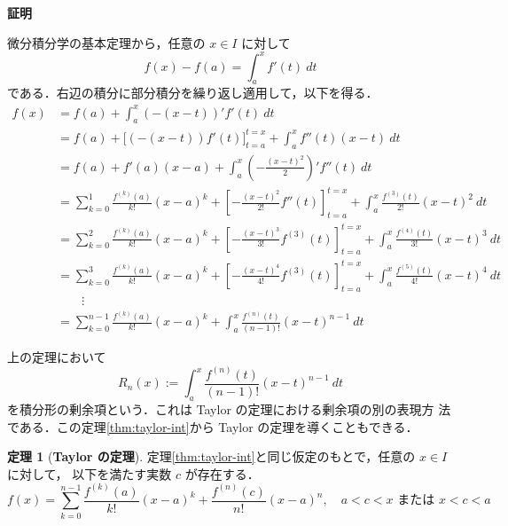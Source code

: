 \documentclass[10pt, uplatex, dvipdfmx]{jsarticle}
\makeatletter
\renewenvironment{proof}[1][\proofname]{\par
  \pushQED{\qed}%
  \normalfont \topsep6\p@\@plus6\p@\relax
  \trivlist
  \item\relax
  {\bfseries
  #1\@addpunct{.}}\hspace\labelsep\ignorespaces
}{%
  \popQED\endtrivlist\@endpefalse
}
\theoremstyle{definition}
\newtheorem{theorem}{定理}[section]
\renewcommand{\proofname}{\textbf{証明}}
\numberwithin{equation}{section}
\makeatother
\begin{document}
\begin{proof}
  微分積分学の基本定理から，任意の $x \in I$ に対して
  \[
    f(x)-f(a) = \int_{a}^{x} f'(t) \ dt
  \]
  である．右辺の積分に部分積分を繰り返し適用して，以下を得る． 
  \[
    \begin{aligned}
      f(x) &= f(a) + \int_{a}^{x} \left( -(x-t)\right)' f'(t) \ dt\\
      &= f(a) + \Big[\left( -\left(x-t\right)\right)f'(t)\Big]_{t=a}^{t=x} + \int_{a}^{x} f''(t)(x-t)\ dt\\
      &= f(a) + f'(a)(x-a)+ \int_{a}^{x} \left( -\frac{(x-t)^2}{2}\right)' f''(t) \ dt\\
      &= \sum_{k=0}^{1}\frac{f^{(k)}(a)}{k!}(x-a)^k + \left[ -\frac{(x-t)^2}{2!}f''(t)\right]_{t=a}^{t=x}
      + \int_{a}^{x}\frac{f^{(3)}(t)}{2!}(x-t)^2\ dt\\
      &= \sum_{k=0}^{2}\frac{f^{(k)}(a)}{k!}(x-a)^k + \left[-\frac{(x-t)^3}{3!}f^{(3)}(t)\right]_{t=a}^{t=x}
      +\int_{a}^{x} \frac{f^{(4)}(t)}{3!}(x-t)^3 \ dt\\
      &= \sum_{k=0}^{3}\frac{f^{(k)}(a)}{k!}(x-a)^k + \left[-\frac{(x-t)^4}{4!}f^{(3)}(t)\right]_{t=a}^{t=x}
      + \int_{a}^{x} \frac{f^{(5)}(t)}{4!} (x-t)^4 \ dt\\
      &\qquad  \vdots\\
      &= \sum_{k=0}^{n-1}\frac{f^{(k)}(a)}{k!}(x-a)^k
      + \int_{a}^{x} \frac{f^{(n)}(t)}{(n-1)!}(x-t)^{n-1} \ dt
    \end{aligned}
  \]

\end{proof}

上の定理において
\[
  R_{n}(x) := \int_{a}^{x}\frac{f^{(n)}(t)}{(n-1)!}(x-t)^{n-1}\ dt
\]
を積分形の剰余項という．これは Taylor の定理における剰余項の別の表現方
法である．この定理\ref{thm:taylor-int}から Taylor の定理を導くこともできる．


\begin{theorem}[\textbf{Taylor の定理}]\label{thm:taylor}
  定理\ref{thm:taylor-int}と同じ仮定のもとで，任意の $x \in I$ に対して，
  以下を満たす実数 $c$ が存在する．
  \[
    f(x) = \sum_{k=0}^{n-1}\frac{f^{(k)}(a)}{k!}(x-a)^k
    +\frac{f^{(n)}(c)}{n!}(x-a)^n, \quad a<c<x \text{ または } x<c<a
  \]
\end{theorem}
\end{document}
